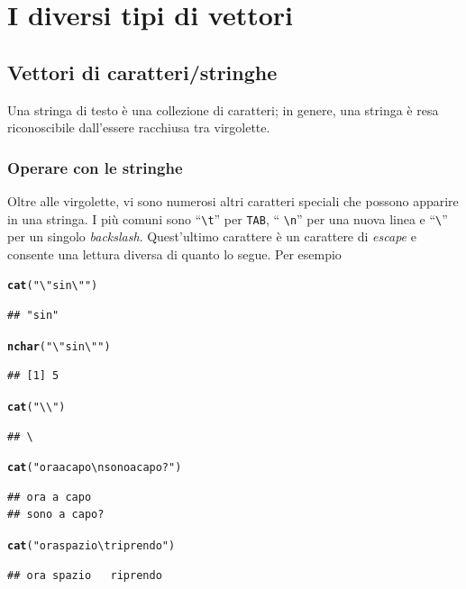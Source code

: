 \documentclass[onecolumn,12pt]{book}\usepackage[]{graphicx}\usepackage[]{color}
\makeatletter
\newcommand{\hlstr}[1]{\textcolor[rgb]{0.192,0.494,0.8}{#1}}%
\newcommand{\hlstd}[1]{\textcolor[rgb]{0.345,0.345,0.345}{#1}}%
\newcommand{\hlkwd}[1]{\textcolor[rgb]{0.737,0.353,0.396}{\textbf{#1}}}%
\newenvironment{kframe}{%
 \def\at@end@of@kframe{}%
 \ifinner\ifhmode%
  \def\at@end@of@kframe{\end{minipage}}%
  \begin{minipage}{\columnwidth}%
 \fi\fi%
 \def\FrameCommand##1{\hskip\@totalleftmargin \hskip-\fboxsep
 \colorbox{shadecolor}{##1}\hskip-\fboxsep
     \hskip-\linewidth \hskip-\@totalleftmargin \hskip\columnwidth}%
 \MakeFramed {\advance\hsize-\width
   \@totalleftmargin\z@ \linewidth\hsize
   \@setminipage}}%
 {\par\unskip\endMakeFramed%
 \at@end@of@kframe}
\newenvironment{knitrout}{}{} %
\makeatother
\begin{document}
\section{I diversi  tipi di vettori}
\subsection{Vettori di caratteri/stringhe}
Una stringa di testo \`e una collezione di caratteri; in genere, una stringa \`e resa riconoscibile dall'essere racchiusa tra virgolette.
\subsubsection{Operare con le stringhe}
Oltre alle virgolette, vi sono numerosi altri caratteri speciali che possono apparire in una stringa.
I pi\`u comuni sono ``\texttt{\textbackslash t}'' per \texttt{TAB}, `` \texttt{\textbackslash n}'' per una nuova linea e ``\texttt{\textbackslash }'' per un singolo {\it backslash}.
Quest'ultimo carattere \`e un carattere di \emph{escape} e consente una lettura diversa di quanto lo segue.  Per esempio
\begin{knitrout}
\color{fgcolor}\begin{kframe}
\begin{alltt}
\hlkwd{cat}\hlstd{(}\hlstr{"\textbackslash{}"sin\textbackslash{}""}\hlstd{)}
\end{alltt}
\begin{verbatim}
## "sin"
\end{verbatim}
\begin{alltt}
\hlkwd{nchar}\hlstd{(}\hlstr{"\textbackslash{}"sin\textbackslash{}""}\hlstd{)}
\end{alltt}
\begin{verbatim}
## [1] 5
\end{verbatim}
\begin{alltt}
\hlkwd{cat}\hlstd{(}\hlstr{"\textbackslash{}\textbackslash{}"}\hlstd{)}
\end{alltt}
\begin{verbatim}
## \
\end{verbatim}
\begin{alltt}
\hlkwd{cat}\hlstd{(}\hlstr{"ora a capo\textbackslash{}nsono a capo?"}\hlstd{)}
\end{alltt}
\begin{verbatim}
## ora a capo
## sono a capo?
\end{verbatim}
\begin{alltt}
\hlkwd{cat}\hlstd{(}\hlstr{"ora spazio\textbackslash{}triprendo"}\hlstd{)}
\end{alltt}
\begin{verbatim}
## ora spazio	riprendo
\end{verbatim}
\end{kframe}
\end{knitrout}
\end{document}
